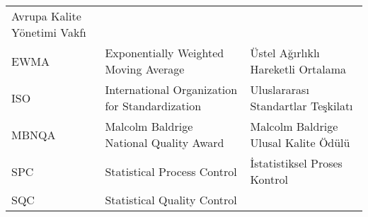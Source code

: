 \documentclass[
]{book}
\begin{document}
\begin{longtable}[]{@{}lll@{}}
\begin{minipage}[t]{0.31\columnwidth}
Avrupa Kalite Yönetimi Vakfı\strut
\end{minipage}\tabularnewline
\begin{minipage}[t]{0.31\columnwidth}\raggedright
EWMA\strut
\end{minipage} & \begin{minipage}[t]{0.29\columnwidth}\raggedright
Exponentially Weighted Moving Average\strut
\end{minipage} & \begin{minipage}[t]{0.31\columnwidth}\raggedright
Üstel Ağırlıklı Hareketli Ortalama\strut
\end{minipage}\tabularnewline
\begin{minipage}[t]{0.31\columnwidth}\raggedright
ISO\strut
\end{minipage} & \begin{minipage}[t]{0.29\columnwidth}\raggedright
International Organization for Standardization\strut
\end{minipage} & \begin{minipage}[t]{0.31\columnwidth}\raggedright
Uluslararası Standartlar Teşkilatı\strut
\end{minipage}\tabularnewline
\begin{minipage}[t]{0.31\columnwidth}\raggedright
MBNQA\strut
\end{minipage} & \begin{minipage}[t]{0.29\columnwidth}\raggedright
Malcolm Baldrige National Quality Award\strut
\end{minipage} & \begin{minipage}[t]{0.31\columnwidth}\raggedright
Malcolm Baldrige Ulusal Kalite Ödülü\strut
\end{minipage}\tabularnewline
\begin{minipage}[t]{0.31\columnwidth}\raggedright
SPC\strut
\end{minipage} & \begin{minipage}[t]{0.29\columnwidth}\raggedright
Statistical Process Control\strut
\end{minipage} & \begin{minipage}[t]{0.31\columnwidth}\raggedright
İstatistiksel Proses Kontrol\strut
\end{minipage}\tabularnewline
\begin{minipage}[t]{0.31\columnwidth}\raggedright
SQC\strut
\end{minipage} & \begin{minipage}[t]{0.29\columnwidth}\raggedright
Statistical Quality Control\strut
\end{minipage} & \begin{minipage}[t]{0.31\columnwidth}\raggedright

\end{minipage}
\end{longtable}
\end{document}
